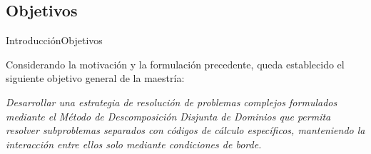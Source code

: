 \subsection{Objetivos}

\begin{frame}{Introducción}{Objetivos}

Considerando la motivación y la formulación precedente, queda establecido el siguiente objetivo general de la maestría:
\vspace{1em}

\textit{Desarrollar una estrategia de resolución de problemas complejos formulados mediante el
Método de Descomposición Disjunta de Dominios que permita resolver subproblemas separados con códigos de cálculo específicos,
manteniendo la interacción entre ellos solo mediante condiciones de borde.}

\end{frame}
